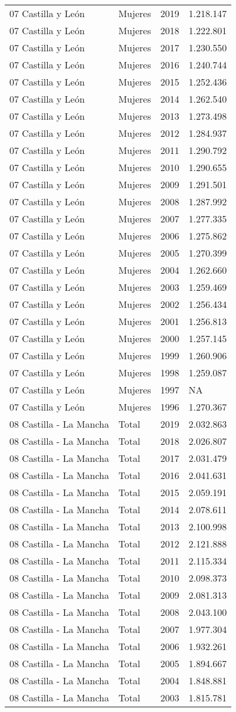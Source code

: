 \documentclass[
]{article}
\begin{document}
\begin{longtable}[]{@{}llrl@{}}
07 Castilla y León & Mujeres & 2019 & 1.218.147\tabularnewline
07 Castilla y León & Mujeres & 2018 & 1.222.801\tabularnewline
07 Castilla y León & Mujeres & 2017 & 1.230.550\tabularnewline
07 Castilla y León & Mujeres & 2016 & 1.240.744\tabularnewline
07 Castilla y León & Mujeres & 2015 & 1.252.436\tabularnewline
07 Castilla y León & Mujeres & 2014 & 1.262.540\tabularnewline
07 Castilla y León & Mujeres & 2013 & 1.273.498\tabularnewline
07 Castilla y León & Mujeres & 2012 & 1.284.937\tabularnewline
07 Castilla y León & Mujeres & 2011 & 1.290.792\tabularnewline
07 Castilla y León & Mujeres & 2010 & 1.290.655\tabularnewline
07 Castilla y León & Mujeres & 2009 & 1.291.501\tabularnewline
07 Castilla y León & Mujeres & 2008 & 1.287.992\tabularnewline
07 Castilla y León & Mujeres & 2007 & 1.277.335\tabularnewline
07 Castilla y León & Mujeres & 2006 & 1.275.862\tabularnewline
07 Castilla y León & Mujeres & 2005 & 1.270.399\tabularnewline
07 Castilla y León & Mujeres & 2004 & 1.262.660\tabularnewline
07 Castilla y León & Mujeres & 2003 & 1.259.469\tabularnewline
07 Castilla y León & Mujeres & 2002 & 1.256.434\tabularnewline
07 Castilla y León & Mujeres & 2001 & 1.256.813\tabularnewline
07 Castilla y León & Mujeres & 2000 & 1.257.145\tabularnewline
07 Castilla y León & Mujeres & 1999 & 1.260.906\tabularnewline
07 Castilla y León & Mujeres & 1998 & 1.259.087\tabularnewline
07 Castilla y León & Mujeres & 1997 & NA\tabularnewline
07 Castilla y León & Mujeres & 1996 & 1.270.367\tabularnewline
08 Castilla - La Mancha & Total & 2019 & 2.032.863\tabularnewline
08 Castilla - La Mancha & Total & 2018 & 2.026.807\tabularnewline
08 Castilla - La Mancha & Total & 2017 & 2.031.479\tabularnewline
08 Castilla - La Mancha & Total & 2016 & 2.041.631\tabularnewline
08 Castilla - La Mancha & Total & 2015 & 2.059.191\tabularnewline
08 Castilla - La Mancha & Total & 2014 & 2.078.611\tabularnewline
08 Castilla - La Mancha & Total & 2013 & 2.100.998\tabularnewline
08 Castilla - La Mancha & Total & 2012 & 2.121.888\tabularnewline
08 Castilla - La Mancha & Total & 2011 & 2.115.334\tabularnewline
08 Castilla - La Mancha & Total & 2010 & 2.098.373\tabularnewline
08 Castilla - La Mancha & Total & 2009 & 2.081.313\tabularnewline
08 Castilla - La Mancha & Total & 2008 & 2.043.100\tabularnewline
08 Castilla - La Mancha & Total & 2007 & 1.977.304\tabularnewline
08 Castilla - La Mancha & Total & 2006 & 1.932.261\tabularnewline
08 Castilla - La Mancha & Total & 2005 & 1.894.667\tabularnewline
08 Castilla - La Mancha & Total & 2004 & 1.848.881\tabularnewline
08 Castilla - La Mancha & Total & 2003 & 1.815.781\tabularnewline

\end{longtable}
\end{document}
